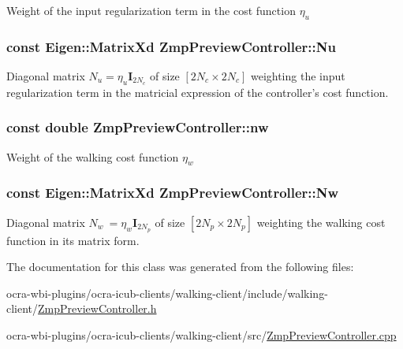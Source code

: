 \-Weight of the input regularization term in the cost function $\eta_u$ \hypertarget{classZmpPreviewController_ac3e92145988993ede7ce2060b997c8db}{
\subsubsection[{\-Nu}]{\setlength{\rightskip}{0pt plus 5cm}const \-Eigen\-::\-Matrix\-Xd {\bf \-Zmp\-Preview\-Controller\-::\-Nu}}}\label{classZmpPreviewController_ac3e92145988993ede7ce2060b997c8db}
\-Diagonal matrix $N_u = \eta_u\mathbf{I}_{2N_c}$ of size $[2N_c \times 2N_c]$ weighting the input regularization term in the matricial expression of the controller's cost function. \hypertarget{classZmpPreviewController_a783427b817d77469e1f80426bede5310}{
\subsubsection[{nw}]{\setlength{\rightskip}{0pt plus 5cm}const double {\bf \-Zmp\-Preview\-Controller\-::nw}}}\label{classZmpPreviewController_a783427b817d77469e1f80426bede5310}
\-Weight of the walking cost function $ \eta_w $ \hypertarget{classZmpPreviewController_a5e85354a1a7c3f2a8e265dbe7367051c}{
\subsubsection[{\-Nw}]{\setlength{\rightskip}{0pt plus 5cm}const \-Eigen\-::\-Matrix\-Xd {\bf \-Zmp\-Preview\-Controller\-::\-Nw}}}\label{classZmpPreviewController_a5e85354a1a7c3f2a8e265dbe7367051c}
\-Diagonal matrix $N_w\ = \eta_w\mathbf{I}_{2N_p}$ of size $[2N_p \times 2N_p]$ weighting the walking cost function in its matrix form. 

\-The documentation for this class was generated from the following files\-:\begin{DoxyCompactItemize}
\item 
ocra-\/wbi-\/plugins/ocra-\/icub-\/clients/walking-\/client/include/walking-\/client/\hyperlink{ZmpPreviewController_8h}{\-Zmp\-Preview\-Controller.\-h}\item 
ocra-\/wbi-\/plugins/ocra-\/icub-\/clients/walking-\/client/src/\hyperlink{ZmpPreviewController_8cpp}{\-Zmp\-Preview\-Controller.\-cpp}\end{DoxyCompactItemize}

